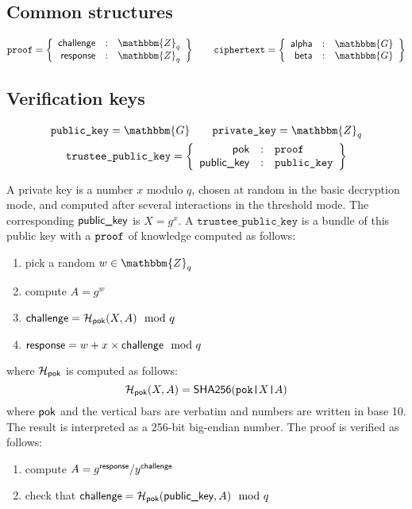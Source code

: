 \documentclass[a4paper]{article}
\newcommand{\G}{\mathbbm{G}}
\newcommand{\Z}{\mathbbm{Z}}
\newcommand{\shatwo}{\textsf{SHA256}}
\newcommand{\tpk}{\texttt{trustee\_public\_key}}
\begin{document}
\subsection{Common structures}
\label{common}

\begin{gather*}
  \proof=\left\{
    \begin{array}{rcl}
      \challenge&:&\Z_q\\
      \response&:&\Z_q
    \end{array}
  \right\}
  \qquad
  \ciphertext=\left\{
    \begin{array}{rcl}
      \alphalabel&:&\G\\
      \betalabel&:&\G
    \end{array}
  \right\}
\end{gather*}

\subsection{Verification keys}
\label{trustee-keys}

\begin{gather*}
  \pk=\G\qquad\sk=\Z_q\\
  \tpk=\left\{
    \begin{array}{rcl}
      \pok&:&\proof\\
      \pklabel&:&\pk
    \end{array}
  \right\}
\end{gather*}

A private key is a number $x$ modulo $q$, chosen at random in the
basic decryption mode, and computed after several interactions in the
threshold mode.
The corresponding
$\textsf{public\_key}$ is $X=g^x$. A $\tpk$ is a bundle of this public key with a
\hyperref[common]{$\texttt{proof}$} of knowledge computed as follows:
\begin{enumerate}
\item pick a random $w\in\Z_q$
\item compute $A=g^w$
\item $\textsf{challenge}=\mathcal{H}_{\textsf{pok}}(X,A)\mod q$
\item $\textsf{response}=w+x\times\textsf{challenge}\mod q$
\end{enumerate}
where $\mathcal{H}_{\textsf{pok}}$ is computed as follows:
\[\Hash_\pok(X,A) = \shatwo(\verb=pok|=X\verb=|=A) \]
where $\textsf{pok}$ and the vertical bars are verbatim and numbers are
written in base 10. The result is interpreted as a 256-bit big-endian
number. The proof is verified as follows:
\begin{enumerate}
\item compute $A={g^{\textsf{response}}}/{y^{\textsf{challenge}}}$
\item check that $\textsf{challenge}=\mathcal{H}_{\textsf{pok}}(\textsf{public\_key},A)\mod q$
\end{enumerate}
\end{document}
